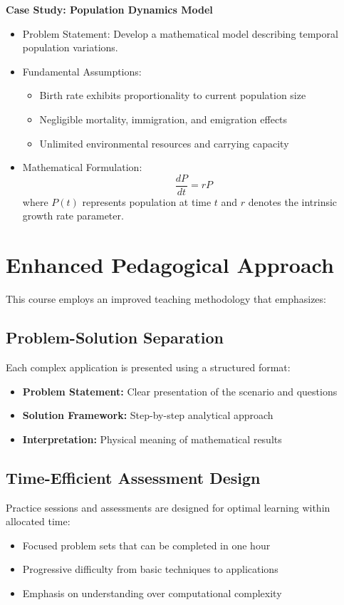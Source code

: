 \documentclass[12pt, letterpaper]{book}
\begin{document}
\textbf{Case Study: Population Dynamics Model}
\begin{itemize}
    \item Problem Statement: Develop a mathematical model describing temporal population variations.
    \item Fundamental Assumptions:
    \begin{itemize}
        \item Birth rate exhibits proportionality to current population size
        \item Negligible mortality, immigration, and emigration effects
        \item Unlimited environmental resources and carrying capacity
    \end{itemize}
    \item Mathematical Formulation:
    \begin{equation*}
        \frac{dP}{dt} = rP
    \end{equation*}
    where $P(t)$ represents population at time $t$ and $r$ denotes the intrinsic growth rate parameter.
\end{itemize}

\section{Enhanced Pedagogical Approach}
This course employs an improved teaching methodology that emphasizes:

\subsection{Problem-Solution Separation}
Each complex application is presented using a structured format:
\begin{itemize}
    \item \textbf{Problem Statement:} Clear presentation of the scenario and questions
    \item \textbf{Solution Framework:} Step-by-step analytical approach
    \item \textbf{Interpretation:} Physical meaning of mathematical results
\end{itemize}

\subsection{Time-Efficient Assessment Design}
Practice sessions and assessments are designed for optimal learning within allocated time:
\begin{itemize}
    \item Focused problem sets that can be completed in one hour
    \item Progressive difficulty from basic techniques to applications
    \item Emphasis on understanding over computational complexity
\end{itemize}
\end{document}
